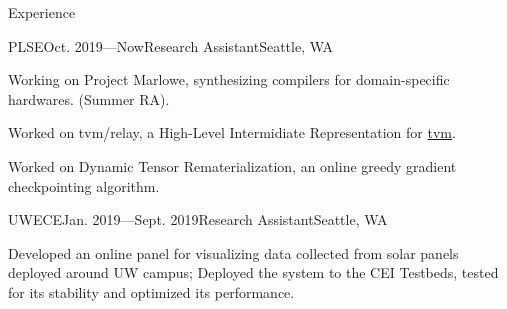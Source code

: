 \documentclass{resume}
\begin{document}

	\begin{rSection}{Experience}



		\begin{rSubsection}{PLSE}{Oct. 2019---Now}{Research Assistant}{Seattle, WA} 
			\item Working on Project Marlowe, synthesizing compilers for domain-specific hardwares. (Summer RA).
			\item Worked on tvm/relay, a High-Level Intermidiate Representation for \href{https://tvm.ai/}{tvm}.
			\item Worked on Dynamic Tensor Rematerialization, an online greedy gradient checkpointing algorithm.
		\end{rSubsection}
		\vspace{-5pt}


		\begin{rSubsection}{UWECE}{Jan. 2019---Sept. 2019}{Research Assistant}{Seattle, WA}
			\item Developed an online panel for visualizing data collected from solar panels deployed around UW campus; Deployed the system to the CEI Testbeds, tested for its stability and optimized its performance.
		\end{rSubsection}
		\vspace{-5pt}


	\end{rSection}
	\vspace{-5pt}
\end{document}
